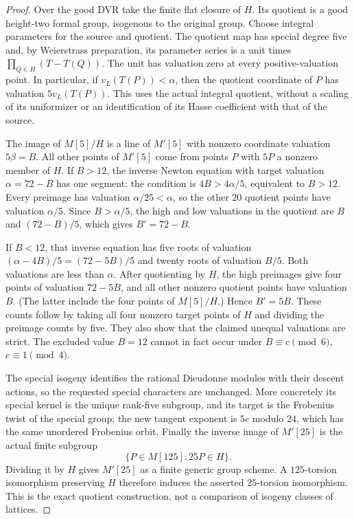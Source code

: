 \begin{proof}
Over the good DVR take the finite flat closure of $H$. Its quotient
is a good height-two formal group, isogenous to the original group.
Choose integral parameters for the source and quotient. The quotient
map has special degree five and, by Weierstrass preparation, its
parameter series is a unit times
$\prod_{Q\in H}(T-T(Q))$. The unit has valuation zero at every
positive-valuation point. In particular, if $v_L(T(P))<\alpha$,
then the quotient coordinate of $P$ has valuation $5v_L(T(P))$.
This uses the actual integral quotient, without a scaling of its
uniformizer or an identification of its Hasse coefficient with
that of the source.

The image of $M[5]/H$ is a line of $M'[5]$ with nonzero coordinate
valuation $5\beta=B$. All other points of $M'[5]$ come from points
$P$ with $5P$ a nonzero member of $H$.
If $B>12$, the inverse Newton equation with target valuation
$\alpha=72-B$ has one segment: the condition is
$4B>4\alpha/5$, equivalent to $B>12$.
Every preimage has valuation $\alpha/25<\alpha$, so the other
$20$ quotient points have valuation $\alpha/5$.
Since $B>\alpha/5$, the high and low valuations in the quotient
are $B$ and $(72-B)/5$, which gives $B'=72-B$.

If $B<12$, that inverse equation has five roots of valuation
$(\alpha-4B)/5=(72-5B)/5$ and twenty roots of valuation $B/5$.
Both valuations are less than $\alpha$. After quotienting by $H$,
the high preimages give four points of valuation $72-5B$, and
all other nonzero quotient points have valuation $B$.
(The latter include the four points of $M[5]/H$.) Hence $B'=5B$.
These counts follow by taking all four nonzero target points of $H$
and dividing the preimage counts by five. They also show that the
claimed unequal valuations are strict. The excluded value $B=12$
cannot in fact occur under $B\equiv c\pmod6$, $c\equiv1\pmod4$.

The special isogeny identifies the rational Dieudonne modules
with their descent actions, so the requested special characters
are unchanged. More concretely its special kernel is the unique
rank-five subgroup, and its target is the Frobenius twist of the
special group; the new tangent exponent is $5c$ modulo $24$, which
has the same unordered Frobenius orbit.
Finally the inverse image of $M'[25]$ is the actual finite subgroup
\[
       \{P\in M[125]:25P\in H\}.
\]
Dividing it by $H$ gives $M'[25]$ as a finite generic group scheme.
A $125$-torsion isomorphism preserving $H$ therefore induces the
asserted $25$-torsion isomorphism. This is the exact quotient
construction, not a comparison of isogeny classes of lattices.
\end{proof}

